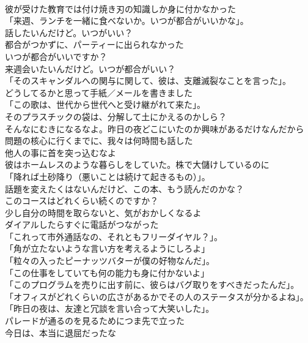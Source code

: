 \documentclass[8pt]{extreport}
\begin{document}
\begin{CJK}{UTF8}{min}
\\	彼が受けた教育では付け焼き刃の知識しか身に付かなかった	
\\	「来週、ランチを一緒に食べないか。いつが都合がいいかな」。	
\\	話したいんだけど。いつがいい？	
\\	都合がつかずに、パーティーに出られなかった	
\\	いつが都合がいいですか？	
\\	来週会いたいんだけど。いつが都合がいい？	
\\	「そのスキャンダルへの関与に関して、彼は、支離滅裂なことを言った」。	
\\	どうしてるかと思って手紙／メールを書きました	
\\	「この歌は、世代から世代へと受け継がれて来た」。	
\\	そのプラスチックの袋は、分解して土にかえるのかしら？	
\\	そんなにむきになるなよ。昨日の夜どこにいたのか興味があるだけなんだから	
\\	問題の核心に行くまでに、我々は何時間も話した	
\\	他人の事に首を突っ込むなよ	
\\	彼はホームレスのような暮らしをしていた。株で大儲けしているのに	
\\	「降れば土砂降り（悪いことは続けて起きるもの）」。	
\\	話題を変えたくはないんだけど、この本、もう読んだのかな？	
\\	このコースはどれくらい続くのですか？	
\\	少し自分の時間を取らないと、気がおかしくなるよ	
\\	ダイアルしたらすぐに電話がつながった	
\\	「これって市外通話なの、それともフリーダイヤル？」。	
\\	「角が立たないような言い方を考えるようにしろよ」	
\\	「粒々の入ったピーナッツバターが僕の好物なんだ」。	
\\	「この仕事をしていても何の能力も身に付かないよ」	
\\	「このプログラムを売りに出す前に、彼らはバグ取りをすべきだったんだ」。	
\\	「オフィスがどれくらいの広さがあるかでその人のステータスが分かるよね」。	
\\	「昨日の夜は、友達と冗談を言い合って大笑いした」。	
\\	パレードが通るのを見るためにつま先で立った	
\\	今日は、本当に退屈だったな	

\end{CJK}
\end{document}

